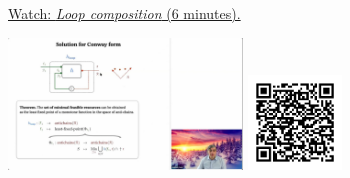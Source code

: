 
\begin{minipage}{10cm}
    \href{https://act4e-spring21.netlify.app/videos/spring2021-functorial-comp-b:solving-queries:solving-loop.html}{Watch: \emph{Loop composition} (6 minutes).}
        
    \href{https://act4e-spring21.netlify.app/videos/spring2021-functorial-comp-b:solving-queries:solving-loop.html}{\includegraphics[height=3.5cm]{spring2021-functorial-comp-b:solving-queries:solving-loop/thumbnails.jpg}}
    \href{https://act4e-spring21.netlify.app/videos/spring2021-functorial-comp-b:solving-queries:solving-loop.html}{\includegraphics[height=2.5cm]{spring2021-functorial-comp-b:solving-queries:solving-loop/qrcode.png}}
\end{minipage}
